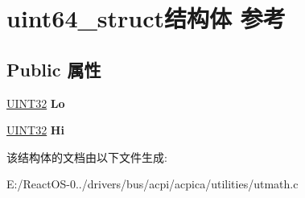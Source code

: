 \hypertarget{structuint64__struct}{}\section{uint64\+\_\+struct结构体 参考}
\label{structuint64__struct}
\subsection*{Public 属性}
\begin{DoxyCompactItemize}
\item 
\mbox{\label{structuint64__struct_aef49e498b084983619f274c1b1eb1cea}} 
\hyperlink{_processor_bind_8h_ae1e6edbbc26d6fbc71a90190d0266018}{U\+I\+N\+T32} {\bfseries Lo}
\item 
\mbox{\label{structuint64__struct_a06a134a99e7aac966083c868ede57125}} 
\hyperlink{_processor_bind_8h_ae1e6edbbc26d6fbc71a90190d0266018}{U\+I\+N\+T32} {\bfseries Hi}
\end{DoxyCompactItemize}


该结构体的文档由以下文件生成\+:\begin{DoxyCompactItemize}
\item 
E\+:/\+React\+O\+S-\/0../drivers/bus/acpi/acpica/utilities/utmath.\+c\end{DoxyCompactItemize}
